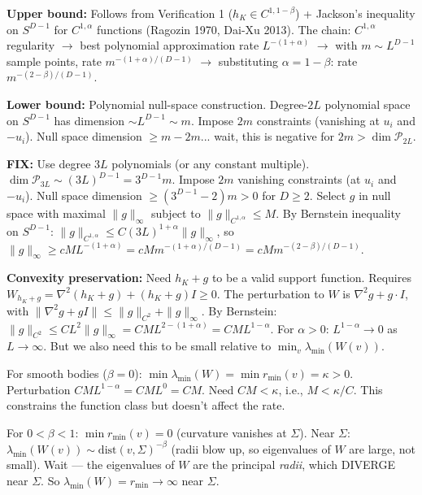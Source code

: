 
\textbf{Upper bound:} Follows from Verification 1 ($h_K \in C^{1,1-\beta}$) + Jackson's inequality on $S^{D-1}$ for $C^{1,\alpha}$ functions (Ragozin 1970, Dai-Xu 2013). The chain: $C^{1,\alpha}$ regularity $\to$ best polynomial approximation rate $L^{-(1+\alpha)}$ $\to$ with $m \sim L^{D-1}$ sample points, rate $m^{-(1+\alpha)/(D-1)}$ $\to$ substituting $\alpha = 1-\beta$: rate $m^{-(2-\beta)/(D-1)}$.

\textbf{Lower bound:} Polynomial null-space construction. Degree-$2L$ polynomial space on $S^{D-1}$ has dimension $\sim L^{D-1} \sim m$. Impose $2m$ constraints (vanishing at $u_i$ and $-u_i$). Null space dimension $\geq m - 2m$... wait, this is negative for $2m > \dim \mathcal{P}_{2L}$.

\textbf{FIX:} Use degree $3L$ polynomials (or any constant multiple). $\dim \mathcal{P}_{3L} \sim (3L)^{D-1} = 3^{D-1} m$. Impose $2m$ vanishing constraints (at $u_i$ and $-u_i$). Null space dimension $\geq (3^{D-1} - 2)m > 0$ for $D \geq 2$. Select $g$ in null space with maximal $\|g\|_\infty$ subject to $\|g\|_{C^{1,\alpha}} \leq M$. By Bernstein inequality on $S^{D-1}$: $\|g\|_{C^{1,\alpha}} \leq C (3L)^{1+\alpha} \|g\|_\infty$, so $\|g\|_\infty \geq cM L^{-(1+\alpha)} = cM m^{-(1+\alpha)/(D-1)} = cM m^{-(2-\beta)/(D-1)}$.

\textbf{Convexity preservation:} Need $h_K + g$ to be a valid support function. Requires $W_{h_K + g} = \nabla^2(h_K + g) + (h_K + g) I \geq 0$. The perturbation to $W$ is $\nabla^2 g + g \cdot I$, with $\|\nabla^2 g + g I\| \leq \|g\|_{C^2} + \|g\|_\infty$. By Bernstein: $\|g\|_{C^2} \leq C L^2 \|g\|_\infty = C M L^{2-(1+\alpha)} = CM L^{1-\alpha}$. For $\alpha > 0$: $L^{1-\alpha} \to 0$ as $L \to \infty$. But we also need this to be small relative to $\min_v \lambda_{\min}(W(v))$.

For smooth bodies ($\beta = 0$): $\min \lambda_{\min}(W) = \min r_{\min}(v) = \kappa > 0$. Perturbation $CML^{1-\alpha} = CML^0 = CM$. Need $CM < \kappa$, i.e., $M < \kappa/C$. This constrains the function class but doesn't affect the rate. \checkmark

For $0 < \beta < 1$: $\min r_{\min}(v) = 0$ (curvature vanishes at $\Sigma$). Near $\Sigma$: $\lambda_{\min}(W(v)) \sim \mathrm{dist}(v,\Sigma)^{-\beta}$ (radii blow up, so eigenvalues of $W$ are large, not small). Wait --- the eigenvalues of $W$ are the principal \emph{radii}, which DIVERGE near $\Sigma$. So $\lambda_{\min}(W) = r_{\min} \to \infty$ near $\Sigma$.

